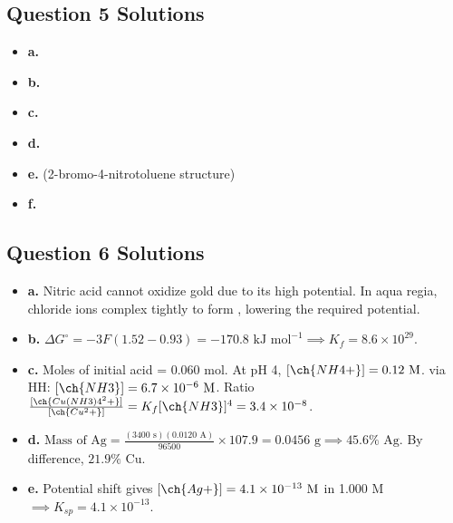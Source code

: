 \documentclass[11pt,letterpaper]{article}
\begin{document}
\subsection*{Question 5 Solutions}
\begin{itemize}[leftmargin=*]
    \item \textbf{a.} 
    \item \textbf{b.} 
    \item \textbf{c.} 
    \item \textbf{d.} 
    \item \textbf{e.}  (2-bromo-4-nitrotoluene structure)
    \item \textbf{f.} 
\end{itemize}

\subsection*{Question 6 Solutions}
\begin{itemize}[leftmargin=*]
    \item \textbf{a.} Nitric acid cannot oxidize gold due to its high potential. In aqua regia, chloride ions complex  tightly to form , lowering the required potential.
    \item \textbf{b.} $\Delta G^\circ = -3F(1.52 - 0.93) = -170.8\text{ kJ mol}^{-1} \implies K_f = 8.6\times 10^{29}$.
    \item \textbf{c.} Moles of initial acid = 0.060 mol. At pH 4, $[\ch{NH4+}] = 0.12\text{ M}$. via HH: $[\ch{NH3}] = 6.7\times 10^{-6}\text{ M}$. Ratio $\frac{[\ch{Cu(NH3)4^2+}]}{[\ch{Cu^2+}]} = K_f[\ch{NH3}]^4 = 3.4\times 10^{-8}$.
    \item \textbf{d.} $\text{Mass of Ag} = \frac{(3400\text{ s})(0.0120\text{ A})}{96500}\times 107.9 = 0.0456\text{ g} \implies 45.6\%\text{ Ag}$. By difference, $21.9\%\text{ Cu}$.
    \item \textbf{e.} Potential shift gives $[\ch{Ag+}] = 4.1\times 10^{-13}\text{ M}$ in 1.000 M  $\implies K_{sp} = 4.1\times 10^{-13}$.
\end{itemize}
\end{document}
